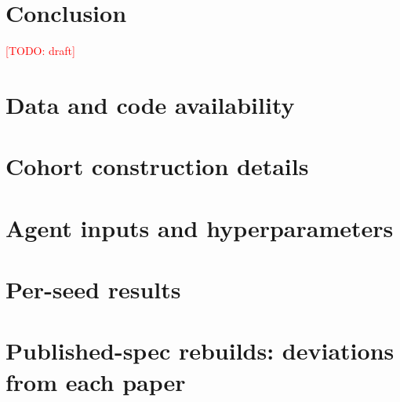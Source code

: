 \documentclass[11pt]{article}
\newcommand{\todo}[1]{\textcolor{red}{[TODO: #1]}}
\begin{document}
\section{Conclusion}\label{sec:conclusion}
\todo{draft}

\section*{Data and code availability}




\appendix
\section{Cohort construction details}
\section{Agent inputs and hyperparameters}
\section{Per-seed results}
\section{Published-spec rebuilds: deviations from each paper}\label{app:specs}
\end{document}
